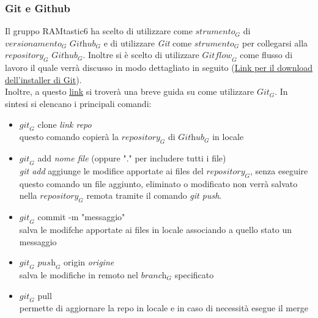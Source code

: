 \subsubsection{Git e Github}
Il gruppo RAMtastic6 ha scelto di utilizzare come $\textit{strumento}_G$ di $\textit{versionamento}_G$ \emph{$\textit{Github}_G$} e di utilizzare \emph{Git} come $\textit{strumento}_G$ per collegarsi alla $\textit{repository}_G$ $\textit{Github}_G$.
Inoltre si è scelto di utilizzare $\textit{Gitflow}_G$ come flusso di lavoro il quale verrà discusso in modo dettagliato in seguito
(\href{https://git-scm.com/downloads}{Link per il download dell'installer di Git}).\\
Inoltre, a questo \href{https://rogerdudler.github.io/git-guide/index.it.html}{link} si troverà una breve guida su come utilizzare $\textit{Git}_G$.
In sintesi si elencano i principali comandi:
\begin{itemize}
    \item $\textit{git}_G$ clone \emph{link repo}\\
    questo comando copierà la $\textit{repository}_G$ di $\textit{Github}_G$ in locale
    \item $\textit{git}_G$ add \emph{nome file} (oppure "." per includere tutti i file)\\
    \emph{git add} aggiunge le modifice apportate ai files del $\textit{repository}_G$, senza eseguire questo comando un file aggiunto, eliminato o modificato non verrà salvato nella $\textit{repository}_G$ remota tramite il comando \emph{git push}.
    \item $\textit{git}_G$ commit -m "messaggio" \\
    salva le modifche apportate ai files in locale associando a quello stato un messaggio
    \item $\textit{git}_G$ $\textit{push}_G$ origin \emph{origine} \\
    salva le modifiche in remoto nel $\textit{branch}_G$ specificato
    \item $\textit{git}_G$ pull \\
    permette di aggiornare la repo in locale e in caso di necessità esegue il merge
\end{itemize}

